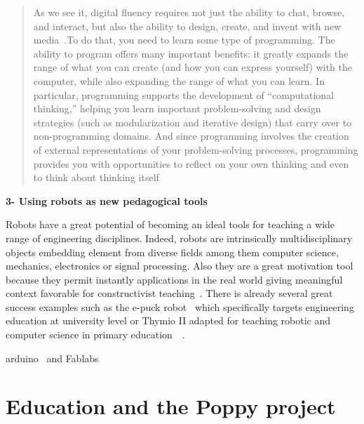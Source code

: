 \begin{quotation}
    As we see it, digital fluency requires not just the ability to chat, browse, and interact, but also the ability to design, create, and invent with new media~\cite{resnick2008sowing}.To do that, you need to learn some type of programming. The ability to program offers many important benefits: it greatly expands the range of what you can create (and how you can express yourself) with the computer, while also expanding the range of what you can learn. In particular, programming supports the development of “computational thinking,” helping you learn important problem-solving and design strategies (such as modularization and iterative design) that carry over to non-programming domains. And since programming involves the creation of external representations of your problem-solving processes, programming provides you with opportunities to reflect on your own thinking and even to think about thinking itself~\cite{disessa2001changing}


\end{quotation}



\textbf{3- Using robots as new pedagogical tools}

Robots have a great potential of becoming an ideal tools for teaching a wide range of engineering disciplines. Indeed, robots are intrinsically multidisciplinary objects embedding element from diverse fields among them computer science, mechanics, electronics or signal processing. Also they are a great motivation tool because they permit instantly applications in the real world giving meaningful context favorable for constructivist teaching~\cite{palincsar1998social}. There is already several great success examples such as the e-puck robot~\cite{mondada2009puck} which specifically targets engineering education at university level or Thymio II adapted for teaching robotic and computer science in primary education~\cite{riedo2012two}~\cite{riedo2013thymio}.

arduino~\cite{mellis2007arduino} and Fablabs



\section{Education and the Poppy project} %

